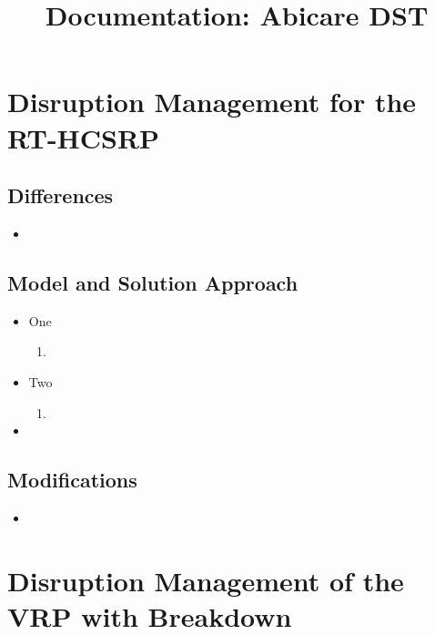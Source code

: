 \documentclass[a4paper]{article}
\begin{document}
\title{Documentation: Abicare DST}
\date{}
\maketitle

\section{Disruption Management for the RT-HCSRP}


\subsection{Differences}
\begin{itemize}[label=\textcolor{myPurple}{\textbullet},leftmargin=*,itemsep=-0.1em]
	\item 
\end{itemize}

\subsection{Model and Solution Approach}
\begin{itemize}[label=\textcolor{myPurple}{\textbullet},leftmargin=*,itemsep=-0.1em]
	\item One
	\begin{enumerate}[label=(\roman*),itemsep=-0.1em]
		\item 
	\end{enumerate}
	\item Two
	\begin{enumerate}[label=(\roman*),itemsep=-0.1em]
		\item
	\end{enumerate}
	\item 
\end{itemize}	

\subsection{Modifications}
\begin{itemize}[label=\textcolor{myPurple}{\textbullet},leftmargin=*,itemsep=-0.1em]
	\item 
\end{itemize}


\section{Disruption Management of the VRP with Breakdown}
\end{document}
